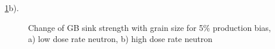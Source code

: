 \documentclass[a4paper]{article}
\begin{document}
    \ref{figure:sink_strengths_neutron_5_1e-6}b).
      \begin{figure}[h!]  %
        \centering
        \qquad
        \caption{Change of GB sink strength with grain size for 5\% production bias, a) low dose rate neutron, b) high dose rate neutron}
        \label{figure:sink_strengths_neutron_5_1e-6}
      \end{figure}
\end{document}
